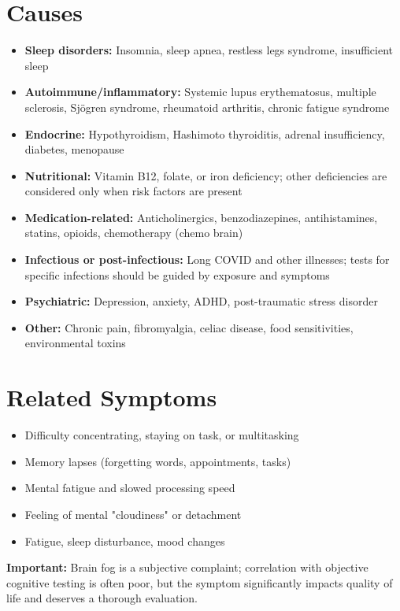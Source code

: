 \section*{Causes}
\begin{itemize}
 \item \textbf{Sleep disorders:} Insomnia, sleep apnea, restless legs syndrome, insufficient sleep
 \item \textbf{Autoimmune/inflammatory:} Systemic lupus erythematosus, multiple sclerosis, Sj\"{o}gren syndrome, rheumatoid arthritis, chronic fatigue syndrome
 \item \textbf{Endocrine:} Hypothyroidism, Hashimoto thyroiditis, adrenal insufficiency, diabetes, menopause
 \item \textbf{Nutritional:} Vitamin B12, folate, or iron deficiency; other deficiencies are considered only when risk factors are present
 \item \textbf{Medication-related:} Anticholinergics, benzodiazepines, antihistamines, statins, opioids, chemotherapy (chemo brain)
 \item \textbf{Infectious or post-infectious:} Long COVID and other illnesses; tests for specific infections should be guided by exposure and symptoms
 \item \textbf{Psychiatric:} Depression, anxiety, ADHD, post-traumatic stress disorder
 \item \textbf{Other:} Chronic pain, fibromyalgia, celiac disease, food sensitivities, environmental toxins
\end{itemize}

\section*{Related Symptoms}
\begin{itemize}
 \item Difficulty concentrating, staying on task, or multitasking
 \item Memory lapses (forgetting words, appointments, tasks)
 \item Mental fatigue and slowed processing speed
 \item Feeling of mental "cloudiness" or detachment
 \item Fatigue, sleep disturbance, mood changes
\end{itemize}
\textbf{Important:} Brain fog is a subjective complaint; correlation with objective cognitive testing is often poor, but the symptom significantly impacts quality of life and deserves a thorough evaluation.

